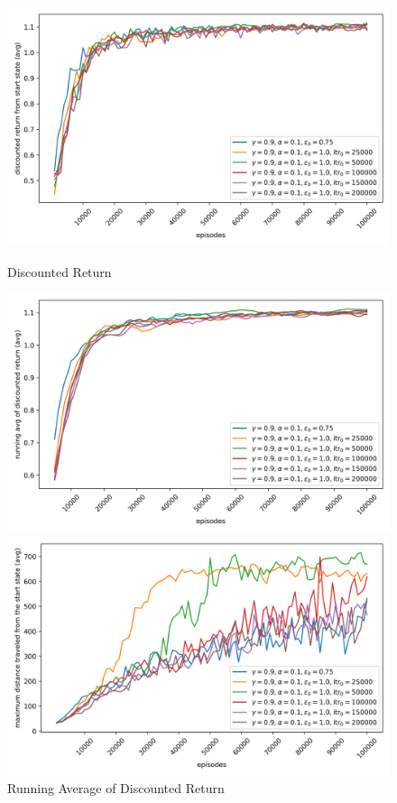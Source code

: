 \begin{figure}[H]
    \vspace{0.5em}

    \begin{minipage}{0.32\linewidth}
        \centering
        \includegraphics[width=\linewidth]{plots/part1-d.linear-rewards.png}
        \caption{Discounted Return}
    \end{minipage}
    \hfill
    \begin{minipage}{0.32\linewidth}
        \centering
        \includegraphics[width=\linewidth]{plots/part1-d.linear-running_returns.png}
        \caption{Running Average of Discounted Return}
    \end{minipage}
    \hfill
    \begin{minipage}{0.32\linewidth}
        \centering
        \includegraphics[width=\linewidth]{plots/part1-d.linear-distances.png}

\end{minipage}
\end{figure}
